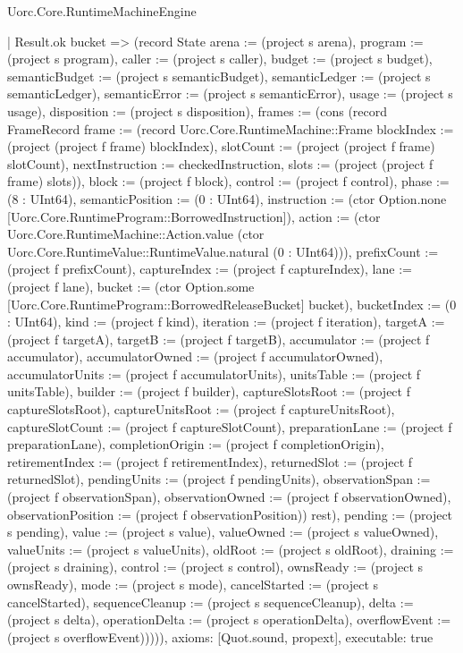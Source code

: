 \begin{lexlean}{Uorc.Core.RuntimeMachineEngine}
\begin{semanticmodule}
{        | Result.ok bucket => (record State {arena := (project s arena), program := (project s program), caller := (project s caller), budget := (project s budget), semanticBudget := (project s semanticBudget), semanticLedger := (project s semanticLedger), semanticError := (project s semanticError), usage := (project s usage), disposition := (project s disposition), frames := (cons (record FrameRecord {frame := (record Uorc.Core.RuntimeMachine::Frame {blockIndex := (project (project f frame) blockIndex), slotCount := (project (project f frame) slotCount), nextInstruction := checkedInstruction, slots := (project (project f frame) slots)}), block := (project f block), control := (project f control), phase := (8 : UInt64), semanticPosition := (0 : UInt64), instruction := (ctor Option.none [Uorc.Core.RuntimeProgram::BorrowedInstruction]), action := (ctor Uorc.Core.RuntimeMachine::Action.value (ctor Uorc.Core.RuntimeValue::RuntimeValue.natural (0 : UInt64))), prefixCount := (project f prefixCount), captureIndex := (project f captureIndex), lane := (project f lane), bucket := (ctor Option.some [Uorc.Core.RuntimeProgram::BorrowedReleaseBucket] bucket), bucketIndex := (0 : UInt64), kind := (project f kind), iteration := (project f iteration), targetA := (project f targetA), targetB := (project f targetB), accumulator := (project f accumulator), accumulatorOwned := (project f accumulatorOwned), accumulatorUnits := (project f accumulatorUnits), unitsTable := (project f unitsTable), builder := (project f builder), captureSlotsRoot := (project f captureSlotsRoot), captureUnitsRoot := (project f captureUnitsRoot), captureSlotCount := (project f captureSlotCount), preparationLane := (project f preparationLane), completionOrigin := (project f completionOrigin), retirementIndex := (project f retirementIndex), returnedSlot := (project f returnedSlot), pendingUnits := (project f pendingUnits), observationSpan := (project f observationSpan), observationOwned := (project f observationOwned), observationPosition := (project f observationPosition)}) rest), pending := (project s pending), value := (project s value), valueOwned := (project s valueOwned), valueUnits := (project s valueUnits), oldRoot := (project s oldRoot), draining := (project s draining), control := (project s control), ownsReady := (project s ownsReady), mode := (project s mode), cancelStarted := (project s cancelStarted), sequenceCleanup := (project s sequenceCleanup), delta := (project s delta), operationDelta := (project s operationDelta), overflowEvent := (project s overflowEvent)})))),
  axioms: [Quot.sound, propext],
  executable: true
}


\end{semanticmodule}
\end{lexlean}
